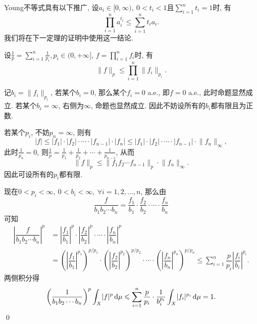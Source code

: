     \begin{Remark}
    Young不等式具有以下推广, 设$ a_i\in[0,\infty),\ 0<t_i<1 $且$ \sum\limits_{i=1}^nt_i=1 $时, 有
    \[
    \prod_{i=1}^na_i^{t_i}\leqslant\sum_{i=1}^nt_ia_i.
    \]
    我们将在下一定理的证明中使用这一结论.
    \end{Remark}

    \begin{Proposition}[H\"older]
            设$ \frac{1}{p}=\sum\limits_{i=1}^n\frac{1}{p_i}, p_{i}\in(0, +\infty] $, $ f=\prod\limits_{i=1}^nf_i $时, 有
            \[
            \lVert f\rVert_p\leqslant\prod_{i=1}^n\lVert f_i\rVert_{p_i}.
            \]
    \end{Proposition}
    \begin{Proof}
            记$ b_i=\lVert f_i\rVert_{p_i} $, 若某个$ b_i=0 $, 那么某个$ f_i=0 $ a.e., 即$ f=0 $ a.e., 此时命题显然成立. 若某个$ b_i=\infty $, 右侧为$ \infty $, 命题也显然成立. 因此不妨设所有的$ b_i $都有限且为正数.

            若某个$ p_i $, 不妨$ p_n=\infty $, 则有
            \[
            \lvert f\rvert\leqslant\lvert f_1\rvert\cdot\lvert f_2\rvert\cdot\cdots\cdot\lvert f_{n-1}\rvert\cdot\lvert f_n\rvert\leqslant \lvert f_1\rvert\cdot\lvert f_2\rvert\cdot\cdots\cdot\lvert f_{n-1}\rvert\cdot\lVert f_n\rVert_\infty,
            \]
            此时$ \frac{1}{p_n}=0 $, 则$ \frac{1}{p}=\frac{1}{p_1}+\frac{1}{p_2}+\cdots+\frac{1}{p_{n-1}} $, 从而
            \[
            \lVert f\rVert_p\leqslant\lVert f_1f_2\cdots f_{n-1}\rVert_p\cdot\lVert f_n\rVert_\infty.
            \]
            因此可设所有的$ p_i $都有限.

            现在$ 0<p_i<\infty,\ 0<b_i<\infty,\ \forall i=1,2, \dots,n $, 那么由
            \[
            \dfrac{f}{b_1b_2\cdots b_n}=\dfrac{f_1}{b_1}\cdot\dfrac{f_2}{b_2}\cdot\cdots\cdot\dfrac{f_n}{b_n}
            \]
            可知
            \begin{align*}
            \left| \dfrac{f}{b_1b_2\cdots b_n} \right|^p&=\left| \dfrac{f_1}{b_1} \right|^p\cdot\left| \dfrac{f_2}{b_2} \right|^p\cdot\cdots\cdot\left| \dfrac{f_n}{b_n} \right|^p\\
            &=\left(\left| \dfrac{f_1}{b_1} \right|^{p_1}\right)^{p/p_1}\cdot\left(\left| \dfrac{f_2}{b_2} \right|^{p_2}\right)^{p/p_2}\cdot\cdots\cdot\left(\left| \dfrac{f_n}{b_n} \right|^{p_n}\right)^{p/p_n}\leqslant\sum_{i=1}^n\dfrac{p}{p_i}\left| \dfrac{f_i}{b_i} \right|^{p_i}.
            \end{align*}
        两侧积分得
            \[
            \left(\dfrac{1}{b_1b_2\cdots b_n}\right)^p\int_X\lvert f\rvert^p\,\mathrm{d}\mu\leqslant\sum_{i=1}^n\dfrac{p}{p_i}\cdot\dfrac{1}{b_i^{p_i}}\int_X\lvert f_i\rvert^{p_i}\,\mathrm{d}\mu=1.
            \]\qed
    \end{Proof}

